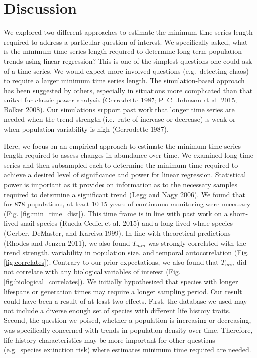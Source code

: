 \documentclass[12pt,]{article}
\begin{document}
\section{Discussion}\label{discussion}

We explored two different approaches to estimate the minimum time series
length required to address a particular question of interest. We
specifically asked, what is the minimum time series length required to
determine long-term population trends using linear regression? This is
one of the simplest questions one could ask of a time series. We would
expect more involved questions (e.g.~detecting chaos) to require a
larger minimum time series length. The simulation-based approach has
been suggested by others, especially in situations more complicated than
that suited for classic power analysis (Gerrodette 1987; P. C. Johnson
et al. 2015; Bolker 2008). Our simulations support past work that longer
time series are needed when the trend strength (i.e.~rate of increase or
decrease) is weak or when population variability is high (Gerrodette
1987).

Here, we focus on an empirical approach to estimate the minimum time
series length required to assess changes in abundance over time. We
examined long time series and then subsampled each to determine the
minimum time required to achieve a desired level of significance and
power for linear regression. Statistical power is important as it
provides on information as to the necessary samples required to
determine a significant trend (Legg and Nagy 2006). We found that for
878 populations, at least 10-15 years of continuous monitoring were
necessary (Fig. \ref{fig:min_time_dist}). This time frame is in line
with past work on a short-lived snail species (Rueda-Cediel et al. 2015)
and a long-lived whale species (Gerber, DeMaster, and Kareiva 1999). In
line with theoretical predictions (Rhodes and Jonzen 2011), we also
found \(T_{min}\) was strongly correlated with the trend strength,
variability in population size, and temporal autocorrelation (Fig.
\ref{fig:correlates}). Contrary to our prior expectations, we also found
that \(T_{min}\) did not correlate with any biological variables of
interest (Fig. \ref{fig:biological_correlates}). We initially
hypothesized that species with longer lifespans or generation times may
require a longer sampling period. Our result could have been a result of
at least two effects. First, the database we used may not include a
diverse enough set of species with different life history traits.
Second, the question we poised, whether a population is increasing or
decreasing, was specifically concerned with trends in population density
over time. Therefore, life-history characteristics may be more important
for other questions (e.g.~species extinction risk) where estimates
minimum time required are needed.
\end{document}
